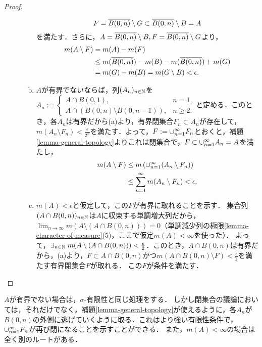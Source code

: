 \documentclass[uplatex, dvipdfmx]{jsreport}
\begin{document}
\begin{proof}
\begin{description}
\begin{enumerate}[(a)]
            \[F=\overline{B(0,n)}\setminus G\subset\overline{B(0,n)}\setminus B=A\]
            を満たす．さらに，$A=\overline{B(0,n)}\setminus B,F=\overline{B(0,n)}\setminus G$より，
            \begin{align*}
                m(A\setminus F)&=m(A)-m(F)\\
                &\le m(\overline{B(0,n)})-m(B)-m(\overline{B(0,n)})+m(G)\\
                &=m(G)-m(B)=m(G\setminus B)<\epsilon.
            \end{align*}
            \item $A$が有界でないならば，列$(A_n)_{n\in\mathbb{N}}$を$A_n:=\begin{cases}
                A\cap B(0,1),&n=1,\\
                A\cap (B(0,n)\setminus B(0,n-1)),&n\ge 2.
            \end{cases}$と定める．このとき，各$A_n$は有界だから(a)より，有界閉集合$F_n\subset A_n$が存在して，$m(A_n\setminus F_n)<\frac{\epsilon}{2^n}$を満たす．よって，$F:=\cup_{n=1}^\infty F_n$とおくと，補題\ref{lemma-general-topology}よりこれは閉集合で，$F\subset\cup_{n=1}^\infty A_n=A$を満たし，
            \begin{align*}
                m(A\setminus F)&\le m\left(\cup_{n=1}^\infty(A_n\setminus F_n)\right)\\
                &\le\sum_{n=1}^\infty m(A_n\setminus F_n)<\epsilon.
            \end{align*}
            \item $m(A)<\epsilon$と仮定して，この$F$が有界に取れることを示す．
            集合列$(A\cap B(0,n))_{n\in\mathbb{N}}$は$A$に収束する単調増大列だから，$\lim_{n\to\infty}m(A\setminus(A\cap B(0,n)))=0$（単調減少列の極限\ref{lemma-character-of-measure}(5)，ここで仮定$m(A)<\infty$を使った）．
            よって，$\exists_{n\in\mathbb{N}}\;m(A\setminus (A\cap B(0,n)))<\frac{\epsilon}{2}$．このとき，$A\cap B(0,n)$は有界だから，(a)より，$F\subset A\cap B(0,n)$かつ$m(A\cap B(0,n)\setminus F)<\frac{\epsilon}{2}$を満たす有界閉集合$F$が取れる．
            この$F$が条件を満たす．
        \end{enumerate}
    \end{description}
\end{proof}
\begin{remarks}
    $A$が有界でない場合は，$\sigma$-有限性と同じ処理をする．
    しかし閉集合の議論においては，それだけでなく，補題\ref{lemma-general-topology}が使えるように，各$A_n$が$B(0,n)$の外側に逃げていくように取る．これはより強い有限性条件で，$\cup_{n=1}^\infty F_n$が再び閉になることを示すことができる．
    また，$m(A)<\infty$の場合は全く別のルートがある．
\end{remarks}
\end{document}
